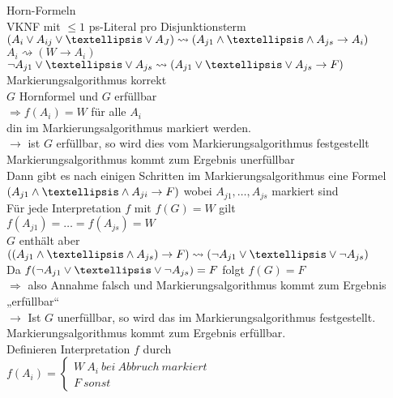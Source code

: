 

Horn-Formeln\\
VKNF mit $\leq 1$ ps-Literal pro Disjunktionsterm\\

$(A_i \OR A_{ij} \OR … \OR A_J) \rightsquigarrow (A_{j1} \AND … \AND A_{js} \rightarrow  A_i)$\\
$A_i \rightsquigarrow (W \rightarrow A_i)$\\
$\neg A_{j1} \OR … \OR A_{js} \rightsquigarrow (A_{j1} \OR … \OR A_{js} \rightarrow F)$\\

\satz{} Markierungsalgorithmus korrekt\\

\beweis{}
$G$ Hornformel und $G$ erfüllbar\\
$\Rightarrow f(A_i) = W$ für alle $A_i$\\
din im Markierungsalgorithmus markiert werden.\\

$\rightarrow$ ist $G$ erfüllbar, so wird dies vom Markierungsalgorithmus festgestellt\\

\annahme{}
Markierungsalgorithmus kommt zum Ergebnis unerfüllbar\\
Dann gibt es nach einigen Schritten im Markierungsalgorithmus eine Formel $(A_{j1} \AND … \AND A_{ji} \rightarrow F)$ wobei $A_{j1}, …, A_{js}$ markiert sind\\

\behauptung{}
Für jede Interpretation $f$ mit $f(G) = W$ gilt\\
$f(A_{j1}) = … = f(A_{js}) = W$\\
$G$ enthält aber $((A_{j1} \AND … \AND A_{js}) \rightarrow F) \rightsquigarrow ( \neg A_{j1} \OR … \OR \neg A_{js})$\\
Da $f(\neg A_{j1} \OR … \OR \neg A_{js}) =F$ folgt $f(G)=F$\\
$\Rightarrow$ also Annahme falsch und Markierungsalgorithmus kommt zum Ergebnis „erfüllbar“\\

$\rightarrow$ Ist $G$ unerfüllbar, so wird das im Markierungsalgorithmus festgestellt.\\

\annahme{}
Markierungsalgorithmus kommt zum Ergebnis erfüllbar.\\
Definieren Interpretation $f$ durch\\
$f(A_i) = \begin{cases} W\ A_i\ bei\ Abbruch\ markiert \\ F\ sonst \end{cases}$\\

